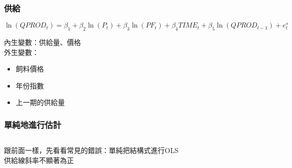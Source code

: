 \begin{frame}
    \frametitle{供給}
    \begin{equation*}
        \ln(QPROD_t) = \beta_1 + \beta_2 \ln(P_t) + \beta_3 \ln(PF_t) + \beta_4 TIME_t + \beta_5 \ln(QPROD_{t-1}) + e_t^s
    \end{equation*}

    內生變數：供給量、價格\\
    外生變數：
    \begin{itemize}
        \item 飼料價格
        \item 年份指數
        \item 上一期的供給量
    \end{itemize}
\end{frame}

\begin{frame}
    \frametitle{單純地進行估計}
    \begin{columns}
        \begin{column}{0.5\textwidth}
            跟前面一樣，先看看常見的錯誤：單純把結構式進行OLS\\[3em]
            
           供給線斜率不顯著為正
        \end{column}

        \begin{column}{0.5\textwidth}
            \begin{table}
                \centering
                \scalebox{0.9}{
                
                }
            \end{table}
        \end{column}
    \end{columns}
    

\end{frame}

